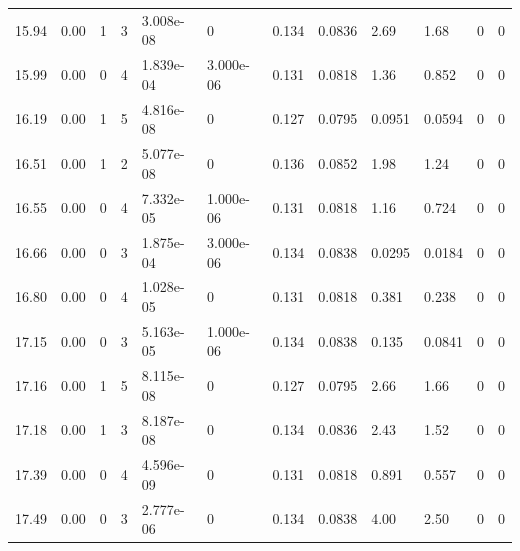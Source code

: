 \documentclass[preview]{standalone}
\begin{document}
{{{\begin{tabular}{L{1.2cm}C{1.2cm} C{0.3cm}C{0.5cm} C{1.4cm}C{1.4cm} C{1.4cm}C{1.4cm} C{1.6cm}C{1.6cm} C{1.6cm}C{1.6cm}}
  15.94  &  0.00  & 1     &  3 &  3.008e-08  & 0  &  0.134&   0.0836& 2.69 & 1.68   &  0 & 0  \\ 
  15.99  &  0.00  & 0     &  4 &  1.839e-04  & 3.000e-06  &  0.131&   0.0818& 1.36 & 0.852   &  0 & 0  \\ 
  16.19  &  0.00  & 1     &  5 &  4.816e-08  & 0  &  0.127&   0.0795& 0.0951 & 0.0594   &  0 & 0  \\ 
  16.51  &  0.00  & 1     &  2 &  5.077e-08  & 0  &  0.136&   0.0852& 1.98 & 1.24   &  0 & 0  \\ 
  16.55  &  0.00  & 0     &  4 &  7.332e-05  & 1.000e-06  &  0.131&   0.0818& 1.16 & 0.724   &  0 & 0  \\ 
  16.66  &  0.00  & 0     &  3 &  1.875e-04  & 3.000e-06  &  0.134&   0.0838& 0.0295 & 0.0184   &  0 & 0  \\ 
  16.80  &  0.00  & 0     &  4 &  1.028e-05  & 0  &  0.131&   0.0818& 0.381 & 0.238   &  0 & 0  \\ 
  17.15  &  0.00  & 0     &  3 &  5.163e-05  & 1.000e-06  &  0.134&   0.0838& 0.135 & 0.0841   &  0 & 0  \\ 
  17.16  &  0.00  & 1     &  5 &  8.115e-08  & 0  &  0.127&   0.0795& 2.66 & 1.66   &  0 & 0  \\ 
  17.18  &  0.00  & 1     &  3 &  8.187e-08  & 0  &  0.134&   0.0836& 2.43 & 1.52   &  0 & 0  \\ 
  17.39  &  0.00  & 0     &  4 &  4.596e-09  & 0  &  0.131&   0.0818& 0.891 & 0.557   &  0 & 0  \\ 
  17.49  &  0.00  & 0     &  3 &  2.777e-06  & 0  &  0.134&   0.0838& 4.00 & 2.50   &  0 & 0  \\ 
\hline 
\end{tabular} 

}}}
\end{document}
